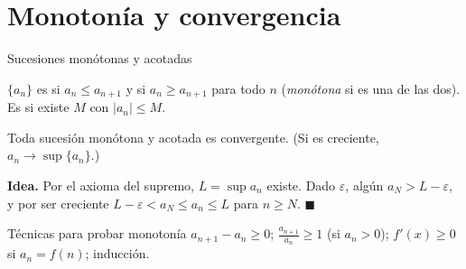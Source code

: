 \documentclass[10pt,aspectratio=169]{beamer}
\begin{document}
\section{Monotonía y convergencia}

\begin{frame}{Sucesiones monótonas y acotadas}
  \begin{definicion}
    $\{a_n\}$ es  si $a_n\le a_{n+1}$ y  si $a_n\ge a_{n+1}$ para todo $n$
    (\emph{monótona} si es una de las dos). Es  si existe $M$ con $|a_n|\le M$.
  \end{definicion}
  \begin{teorema}
    Toda sucesión monótona y acotada es convergente. (Si es creciente, $a_n\to\sup\{a_n\}$.)
  \end{teorema}
  \textbf{Idea.} Por el axioma del supremo, $L=\sup a_n$ existe. Dado $\varepsilon$, algún $a_N>L-\varepsilon$, y por ser creciente
  $L-\varepsilon<a_N\le a_n\le L$ para $n\ge N$. $\blacksquare$
  \begin{block}{Técnicas para probar monotonía}
    $a_{n+1}-a_n\ge0$; \quad $\frac{a_{n+1}}{a_n}\ge1$ (si $a_n>0$); \quad $f'(x)\ge0$ si $a_n=f(n)$; \quad inducción.
  \end{block}
\end{frame}
\end{document}
